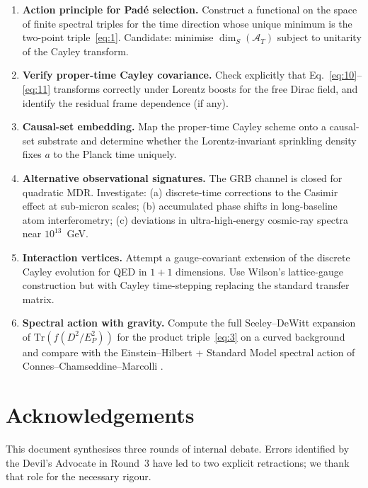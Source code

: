\documentclass[11pt,a4paper]{article}
\begin{document}
\begin{enumerate}
  \item \textbf{Action principle for Padé selection.} Construct a functional on the space of finite spectral triples for the time direction whose unique minimum is the two-point triple~\eqref{eq:1}. Candidate: minimise $\dim_S(\mathcal{A}_T)$ subject to unitarity of the Cayley transform.

  \item \textbf{Verify proper-time Cayley covariance.} Check explicitly that Eq.~\eqref{eq:10}--\eqref{eq:11} transforms correctly under Lorentz boosts for the free Dirac field, and identify the residual frame dependence (if any).

  \item \textbf{Causal-set embedding.} Map the proper-time Cayley scheme onto a causal-set substrate \cite{henson2006} and determine whether the Lorentz-invariant sprinkling density fixes $a$ to the Planck time uniquely.

  \item \textbf{Alternative observational signatures.} The GRB channel is closed for quadratic MDR. Investigate: (a) discrete-time corrections to the Casimir effect at sub-micron scales; (b) accumulated phase shifts in long-baseline atom interferometry; (c) deviations in ultra-high-energy cosmic-ray spectra near $10^{13}$~GeV.

  \item \textbf{Interaction vertices.} Attempt a gauge-covariant extension of the discrete Cayley evolution for QED in $1+1$ dimensions. Use Wilson's lattice-gauge construction but with Cayley time-stepping replacing the standard transfer matrix.

  \item \textbf{Spectral action with gravity.} Compute the full Seeley--DeWitt expansion of $\mathrm{Tr}(f(D^2/E_P^2))$ for the product triple~\eqref{eq:3} on a curved background and compare with the Einstein--Hilbert + Standard Model spectral action of Connes--Chamseddine--Marcolli \cite{ashtekar2004}.
\end{enumerate}

\section*{Acknowledgements}
This document synthesises three rounds of internal debate. Errors identified by the Devil's Advocate in Round~3 have led to two explicit retractions; we thank that role for the necessary rigour.
\end{document}
